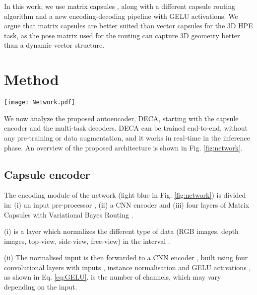 \documentclass[10pt,twocolumn,letterpaper]{article}
\begin{document}
In this work, we use matrix capsules \cite{hinton2018matrix}, along with a different capsule routing algorithm and a new encoding-decoding pipeline with GELU activations. We argue that matrix capsules are better suited than vector capsules for the 3D HPE task, as the  pose matrix used for the routing can capture 3D geometry better than a dynamic vector structure.

\section{Method}
\label{sec:method}


\begin{figure*}
    \centering
    \texttt{[image: Network.pdf]}
    \label{fig:network}
\end{figure*}

We now analyze the proposed autoencoder, DECA, starting with the capsule encoder and the multi-task decoders.
DECA can be trained end-to-end, without any pre-training or data augmentation, and it works in real-time in the inference phase. An overview of the proposed architecture is shown in Fig. \ref{fig:network}.

\subsection{Capsule encoder}
\label{subsec:encoder}
The encoding module of the network (light blue in Fig. \ref{fig:network}) is divided in: (i) an input pre-processor , (ii) a CNN encoder  and (iii) four layers of Matrix Capsules with Variational Bayes Routing \cite{ribeiro2020capsule}.

 (i)  is a  layer which normalizes the different type of data (RGB images, depth images, top-view, side-view, free-view) in the interval . 


(ii) The normalised input is then forwarded to a CNN encoder , built using four convolutional layers with inputs , instance normalisation and GELU activations \cite{hendrycks2016gaussian}, as shown in Eq. \ref{eq:GELU}.  is the number of channels, which may vary depending on the input.
\end{document}

